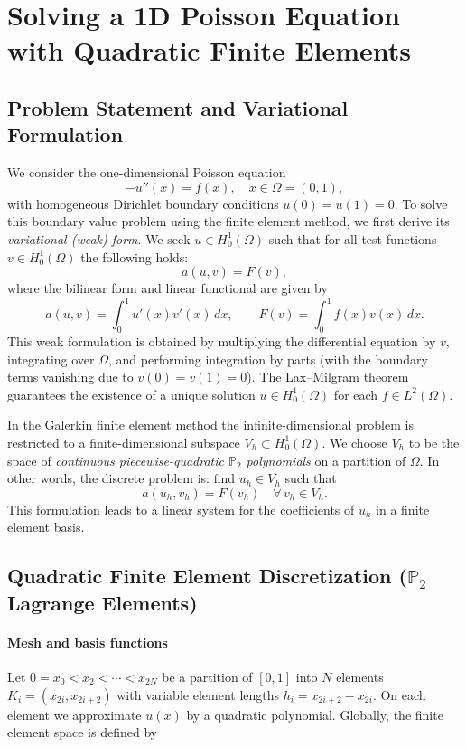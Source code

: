 \documentclass[a4paper,10pt]{article}
\begin{document}

\clearpage

\section{Solving a 1D Poisson Equation with Quadratic Finite Elements}

\subsection{Problem Statement and Variational Formulation}

We consider the one-dimensional Poisson equation
\[
	-u''(x)=f(x), \quad x\in\Omega=(0,1),
\]
with homogeneous Dirichlet boundary conditions \(u(0)=u(1)=0\).
To solve this boundary value problem using the finite element method, we first derive its \emph{variational (weak) form}. We seek \(u\in H_0^1(\Omega)\) such that for all test functions \(v\in H_0^1(\Omega)\) the following holds:
\[
	a(u,v)=F(v),
\]
where the bilinear form and linear functional are given by
\[
	a(u,v)=\int_0^1 u'(x)v'(x)\,dx,\qquad F(v)=\int_0^1 f(x)v(x)\,dx.
\]
This weak formulation is obtained by multiplying the differential equation by \(v\), integrating over \(\Omega\), and performing integration by parts (with the boundary terms vanishing due to \(v(0)=v(1)=0\)). The Lax--Milgram theorem guarantees the existence of a unique solution \(u\in H_0^1(\Omega)\) for each \(f\in L^2(\Omega)\).

In the Galerkin finite element method the infinite-dimensional problem is restricted to a finite-dimensional subspace \(V_h\subset H_0^1(\Omega)\). We choose \(V_h\) to be the space of \emph{continuous piecewise-quadratic \(\mathbb{P}_2\) polynomials} on a partition of \(\Omega\). In other words, the discrete problem is: find \(u_h\in V_h\) such that
\[
	a(u_h,v_h)=F(v_h)\quad\forall\, v_h\in V_h.
\]
This formulation leads to a linear system for the coefficients of \(u_h\) in a finite element basis.

\subsection{Quadratic Finite Element Discretization (\(\mathbb{P}_2\) Lagrange Elements)}

\paragraph{Mesh and basis functions}
Let \(0=x_0<x_2<\cdots<x_{2N}\) be a partition of \([0,1]\) into \(N\) elements \(K_i=(x_{2i},x_{2i+2})\) with variable element lengths \(h_i=x_{2i+2}-x_{2i}\).
On each element we approximate \(u(x)\) by a quadratic polynomial.
Globally, the finite element space is defined by
\end{document}
